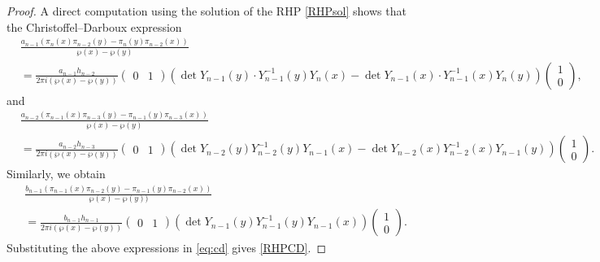 \documentclass[11pt,a4paper]{article}
\theoremstyle{definition}
\numberwithin{equation}{section}
\numberwithin{theorem}{section}
\begin{document}
\begin{proof}
A direct computation using the solution of the RHP \eqref{RHPsol} shows that the Christoffel–Darboux expression
\begin{align}
&\frac{a_{n-1} \left( \pi_n(x) \pi_{n-2}(y) - \pi_n(y) \pi_{n-2}(x) \right)}{\wp(x) - \wp(y)}\\
&=
\frac{a_{n-1} h_{n-2}}{2\pi i (\wp(x) - \wp(y))} 
\begin{pmatrix} 0 & 1 \end{pmatrix}
\left( 
\det Y_{n-1}(y) \cdot Y_{n-1}^{-1}(y) Y_n(x) 
- 
\det Y_{n-1}(x) \cdot Y_{n-1}^{-1}(x) Y_n(y) 
\right)
\begin{pmatrix} 1 \\ 0 \end{pmatrix},\label{t1}
\end{align}
and
 \begin{align}
&\frac{a_{n-2} \left( \pi_{n-1}(x) \pi_{n-3}(y) - \pi_{n-1}(y) \pi_{n-3}(x) \right)}{\wp(x) - \wp(y)}\\
&=\frac{a_{n-2} h_{n-3}}{2\pi i (\wp(x) - \wp(y))} \begin{pmatrix} 0 & 1 \end{pmatrix} \left( \det Y_{n-2}(y) Y_{n-2}^{-1}(y) Y_{n-1}(x) - \det Y_{n-2}(x) Y_{n-2}^{-1}(x) Y_{n-1}(y) \right) \begin{pmatrix} 1 \\ 0 \end{pmatrix}.
 \end{align}
Similarly, we obtain
\begin{align}
&\frac{b_{n-1} \left( \pi_{n-1}(x)\pi_{n-2}(y) - \pi_{n-1}(y)\pi_{n-2}(x) \right)}{\wp(x)-\wp(y))}\\
&=\frac{b_{n-1} h_{n-1}}{2\pi i (\wp(x) - \wp(y))} \begin{pmatrix} 0 & 1 \end{pmatrix} \left( \det Y_{n-1}(y) Y_{n-1}^{-1}(y) Y_{n-1}(x) \right) \begin{pmatrix} 1 \\ 0 \end{pmatrix}.
\end{align}
Substituting the above expressions in \eqref{eq:cd} gives \eqref{RHPCD}.
\end{proof}
\end{document}
